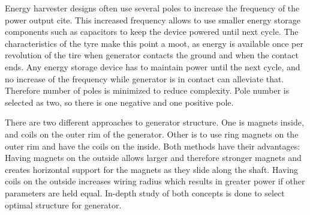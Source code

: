 \begin{table}[htb]
\caption{\label{parameters_of_lg} Effect of parameters of generator}
\begin{center}
\end{center}
\end{table}

Energy harvester designs often use several poles to increase the frequency of the power output {\color{red}cite}. This increased frequency allows to use smaller energy storage components such as capacitors to keep the device powered until next cycle. The characteristics of the tyre make this point a moot, as energy is available once per revolution of the tire when generator contacts the ground and when the contact ends. Any energy storage device has to maintain power until the next cycle, and no increase of the frequency while generator is in contact can alleviate that. Therefore number of poles is minimized to reduce complexity. Pole number is selected as two, so there is one negative and one positive pole. 

There are two different approaches to generator structure. One is magnets inside, and coils on the outer rim of the generator. Other is to use ring magnets on the outer rim and have the coils on the inside. Both methods have their advantages: Having magnets on the outside allows larger and therefore stronger magnets and creates horizontal support for the magnets as they slide along the shaft. Having coils on the outside increases wiring radius which results in greater power if other parameters are held equal. In-depth study of both concepts is done to select optimal structure for generator. 

